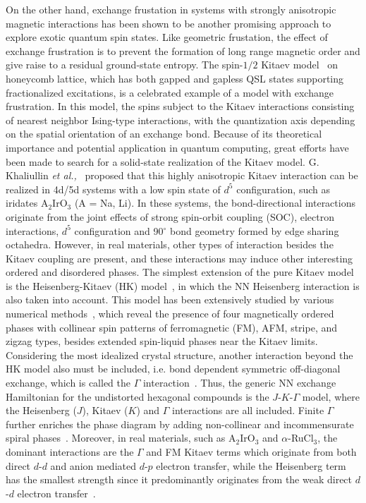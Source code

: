 \documentclass[aps,prb,reprint,amsfonts,amsmath,amssymb,showpacs,groupedaddress,superscriptaddress]{revtex4-1}
\begin{document}
On the other hand, exchange frustation in systems with strongly anisotropic magnetic interactions has been shown to be another promising approach to explore exotic quantum spin states. Like geometric frustation, the effect of exchange frustration is to prevent the formation of long range magnetic order and give raise to a residual ground-state entropy. The spin-$1/2$ Kitaev model~\cite{Kitaev2006} on honeycomb lattice, which has both gapped and gapless QSL states supporting fractionalized excitations, is a celebrated example of a model with exchange frustration. In this model, the spins subject to the Kitaev interactions consisting of nearest neighbor Ising-type interactions, with the quantization axis depending on the spatial orientation of an exchange bond. Because of its theoretical importance and potential application in quantum computing, great efforts have been made to search for a solid-state realization of the Kitaev model. G. Khaliullin \emph{et al.,}~\cite{Khaliullin2005,PhysRevLett.102.017205} proposed that this highly anisotropic Kitaev interaction can be realized in 4d/5d systems with a low spin state of $d^5$ configuration, such as iridates A$_2$IrO$_3$ (A = Na, Li). In these systems, the bond-directional interactions originate from the joint effects of strong spin-orbit coupling (SOC), electron interactions, $d^5$ configuration and 90$^\circ$ bond geometry formed by edge sharing octahedra. However, in real materials, other types of interaction besides the Kitaev coupling are present, and these interactions may induce other interesting ordered and disordered phases. The simplest extension of the pure Kitaev model is the Heisenberg-Kitaev (HK) model~\cite{PhysRevLett.105.027204}, in which the NN Heisenberg interaction is also taken into account. This model has been extensively studied by various numerical methods~\cite{PhysRevLett.110.097204,PhysRevB.83.245104,PhysRevB.84.100406,PhysRevB.90.195102,PhysRevLett.119.157203}, which reveal the presence of four magnetically ordered phases with collinear spin patterns of ferromagnetic (FM), AFM, stripe, and zigzag types, besides extended spin-liquid phases near the Kitaev limits. Considering the most idealized crystal structure, another interaction beyond the HK model also must be included, i.e. bond dependent symmetric off-diagonal exchange, which is called the $\Gamma$ interaction~\cite{PhysRevLett.112.077204,PhysRevB.93.214431,PhysRevB.96.115103}. Thus, the generic NN exchange Hamiltonian for the undistorted hexagonal compounds is the $J$-$K$-$\Gamma$ model, where the Heisenberg ($J$), Kitaev ($K$) and $\Gamma$ interactions are all included. Finite $\Gamma$ further enriches the phase diagram by adding non-collinear and incommensurate spiral phases~\cite{PhysRevLett.112.077204}. Moreover, in real materials, such as A$_2$IrO$_3$ and $\alpha$-RuCl$_{3}$, the dominant interactions are the $\Gamma$ and FM Kitaev terms which originate from both direct $d$-$d$ and anion mediated $d$-$p$ electron transfer, while the Heisenberg term has the smallest strength since it predominantly originates from the weak direct $d$-$d$ electron transfer~\cite{PhysRevLett.112.077204,PhysRevB.93.214431,PhysRevB.96.115103}.
\end{document}
